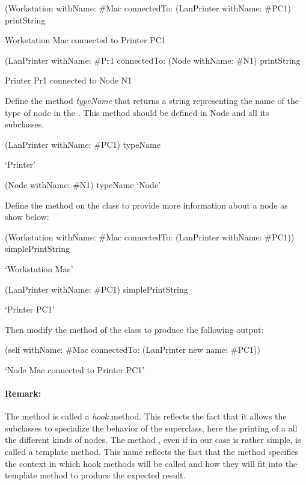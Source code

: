 \begin{scode}
 (Workstation withName: \#Mac connectedTo: (LanPrinter withName: 
\#PC1) printString

      Workstation Mac connected to Printer PC1

(LanPrinter withName: \#Pr1 connectedTo: (Node withName: \#N1) 
printString

     Printer Pr1 connected to Node N1
\end{scode}

Define the method \emph{typeName} that returns a string representing 
the name of the type of node in the . This 
method should be defined in Node and all its subclasses. 

\begin{scode}
(LanPrinter withName: \#PC1) typeName

      `Printer'

(Node withName: \#N1) typeName
     `Node'
\end{scode}

 
Define the method  on the class  to provide 
more information about a node as show below:

\begin{scode}
(Workstation withName: \#Mac connectedTo: (LanPrinter withName: 
\#PC1)) simplePrintString

      `Workstation Mac'

(LanPrinter withName: \#PC1) simplePrintString

      `Printer PC1'
\end{scode}

Then modify the  method of the class  to produce 
the following output:

\begin{scode}
(self withName: \#Mac connectedTo: (LanPrinter new name: 
\#PC1))

`Node Mac connected to Printer PC1'
\end{scode}

\paragraph{Remark:} The method  is called a \textit{hook} method. This 
reflects the fact that it allows the subclasses to specialize the behavior of the superclass, here the printing of a all the different kinds of nodes. The method , even if in our case is rather simple, is called a template method.  This name reflects the fact that the method specifies the context in which hook methods will be called and how they will fit into the template method to produce the expected result. 


